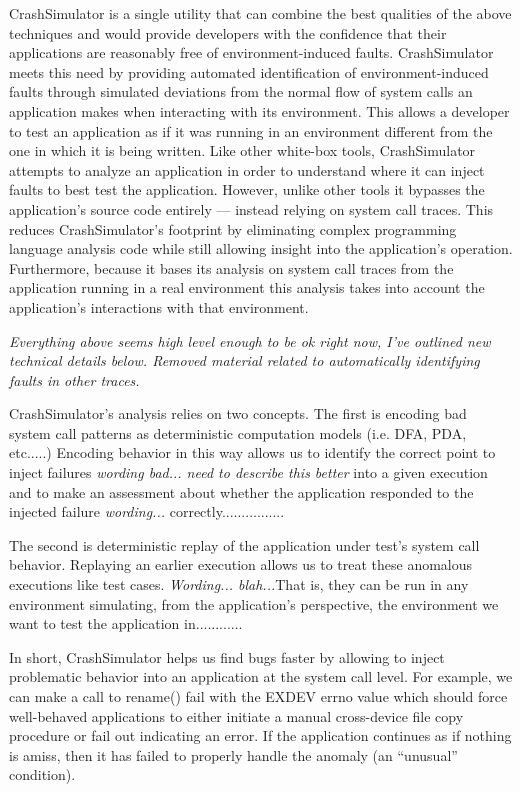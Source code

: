     CrashSimulator is a single utility that can combine the best qualities of the above techniques and would provide
    developers with the confidence that their applications are reasonably free of environment-induced faults.
    CrashSimulator meets this need by providing automated identification of environment-induced faults through simulated
    deviations from the normal flow of system calls an application makes when interacting with its environment. This
    allows a developer to test an application as if it was running in an environment different from the one in which it
    is being written. Like other white-box tools, CrashSimulator attempts to analyze an application in order to
    understand where it can inject faults to best test the application. However, unlike other tools it bypasses the
    application's source code entirely --- instead relying on system call traces. This reduces CrashSimulator's
    footprint by eliminating complex programming language analysis code while still allowing insight into the
    application's operation. Furthermore, because it bases its analysis on system call traces from the application
    running in a real environment this analysis takes into account the application's interactions with that environment.

    \emph{Everything above seems high level enough to be ok right now, I've outlined new technical details
      below. Removed material related to automatically identifying faults in other traces.}
    
    CrashSimulator's analysis relies on two concepts. The first is encoding bad system call patterns as deterministic
    computation models (i.e. DFA, PDA, etc.....) Encoding behavior in this way allows us to identify the correct point
    to inject failures \emph{wording bad... need to describe this better} into a given execution and to make an 
    assessment about whether the application responded to the injected failure \emph{wording...} correctly................

    The second is deterministic replay of the application under test's system call behavior. Replaying an earlier
    execution allows us to treat these anomalous executions like test cases. \emph{Wording... blah...}That is, they can be
    run in any environment simulating, from the application's perspective, the environment we want to test the application
    in............
    
    In short, CrashSimulator helps us find bugs faster by allowing to inject problematic behavior into an application at
    the system call level.  For example, we can make a call to rename() fail with the EXDEV errno value which should
    force well-behaved applications to either initiate a manual cross-device file copy procedure or fail out indicating
    an error.  If the application continues as if nothing is amiss, then it has failed to properly handle the anomaly
    (an ``unusual'' condition).

